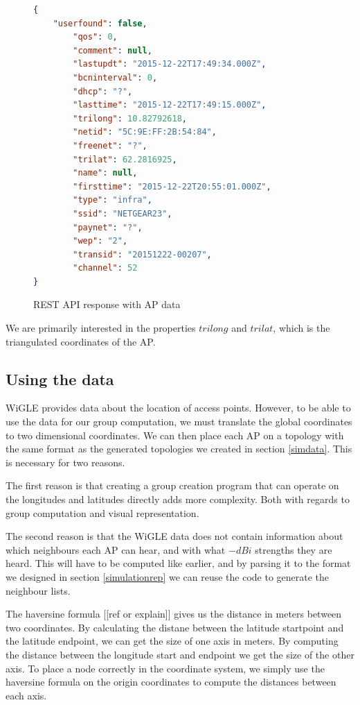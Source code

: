 	  \begin{figure}
	  \begin{minipage}{\linewidth}

	  \begin{lstlisting}[language=json]
{
	"userfound": false,
		"qos": 0,
		"comment": null,
		"lastupdt": "2015-12-22T17:49:34.000Z",
		"bcninterval": 0,
		"dhcp": "?",
		"lasttime": "2015-12-22T17:49:15.000Z",
		"trilong": 10.82792618,
		"netid": "5C:9E:FF:2B:54:84",
		"freenet": "?",
		"trilat": 62.2816925,
		"name": null,
		"firsttime": "2015-12-22T20:55:01.000Z",
		"type": "infra",
		"ssid": "NETGEAR23",
		"paynet": "?",
		"wep": "2",
		"transid": "20151222-00207",
		"channel": 52
}

\end{lstlisting}

\label{fig:wigle}
\end{minipage}
\caption{REST API response with AP data}
\end{figure}

We are primarily interested in the properties $trilong$ and $trilat$, which is
the triangulated coordinates of the AP. 

\subsection{Using the data}
WiGLE provides data about the location of access points. However, to be able to
use the data for our group computation, we must translate the global coordinates
to two dimensional coordinates. We can then place each AP on a topology with the
same format as the generated topologies we created in section \ref{simdata}.
This is necessary for two reasons.

The first reason is that creating a group creation program that can operate
on the longitudes and latitudes directly adds more complexity. Both with regards to
group computation and visual representation. 

The second reason is that the WiGLE data does not contain information about
which neighbours each AP can hear, and with what $-dBi$ strengths they are heard.
This will have to be computed like earlier, and by parsing it to the format
we designed in section \ref{simulationrep} we can reuse the code to generate the neighbour lists.

The haversine formula [[ref or explain]] gives us the distance in meters between two coordinates. By calculating
the distane between the latitude startpoint and the latitude endpoint, we can get the size of one
axis in meters. By computing the distance between the longitude start and endpoint we get the size of the
other axis. To place a node correctly in the coordinate system, we simply use the haversine formula on the
origin coordinates to compute the distances between each axis. 

